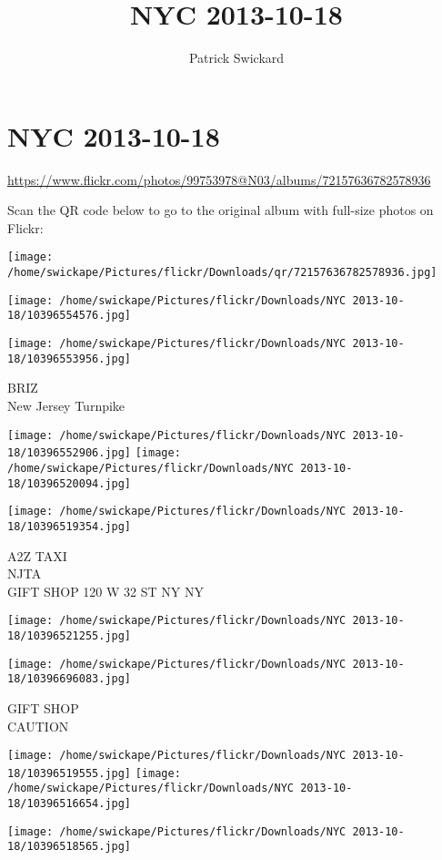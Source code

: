 \documentclass[10pt,letterpaper]{article}
\title{NYC 2013-10-18}
\author{Patrick Swickard}
\date{}
\begin{document}
\section*{NYC 2013-10-18}

\url{https://www.flickr.com/photos/99753978@N03/albums/72157636782578936}

Scan the QR code below to go to the original album with full-size photos on Flickr:

\texttt{[image: /home/swickape/Pictures/flickr/Downloads/qr/72157636782578936.jpg]}
\pagebreak

\texttt{[image: /home/swickape/Pictures/flickr/Downloads/NYC 2013-10-18/10396554576.jpg]}

\vspace{0.25in}
\texttt{[image: /home/swickape/Pictures/flickr/Downloads/NYC 2013-10-18/10396553956.jpg]}

BRIZ\\
New Jersey Turnpike
\pagebreak

\texttt{[image: /home/swickape/Pictures/flickr/Downloads/NYC 2013-10-18/10396552906.jpg]}
\texttt{[image: /home/swickape/Pictures/flickr/Downloads/NYC 2013-10-18/10396520094.jpg]}

\vspace{0.25in}
\texttt{[image: /home/swickape/Pictures/flickr/Downloads/NYC 2013-10-18/10396519354.jpg]}

A2Z TAXI\\
NJTA\\
GIFT SHOP 120 W 32 ST NY NY
\pagebreak

\texttt{[image: /home/swickape/Pictures/flickr/Downloads/NYC 2013-10-18/10396521255.jpg]}

\vspace{0.25in}
\texttt{[image: /home/swickape/Pictures/flickr/Downloads/NYC 2013-10-18/10396696083.jpg]}

GIFT SHOP\\
CAUTION
\pagebreak

\texttt{[image: /home/swickape/Pictures/flickr/Downloads/NYC 2013-10-18/10396519555.jpg]}
\texttt{[image: /home/swickape/Pictures/flickr/Downloads/NYC 2013-10-18/10396516654.jpg]}

\vspace{0.25in}
\texttt{[image: /home/swickape/Pictures/flickr/Downloads/NYC 2013-10-18/10396518565.jpg]}
\end{document}
